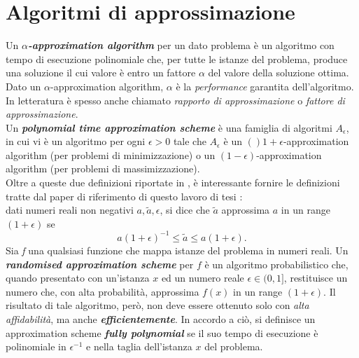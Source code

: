 \section{Algoritmi di approssimazione}\label{sec:approxalgo}
Un \textit{\textbf{$\alpha$-approximation algorithm}} per un dato problema è un algoritmo con tempo di esecuzione polinomiale che, per tutte le istanze del problema, produce una soluzione il cui valore è entro un fattore $\alpha$ del valore della soluzione ottima.\\
Dato un $\alpha$-approximation algorithm, $\alpha$ è la \textit{performance} garantita dell'algoritmo. In letteratura è spesso anche chiamato \textit{rapporto di approssimazione} o \textit{fattore di approssimazione}.\\
Un \textit{\textbf{polynomial time approximation scheme}} è una famiglia di algoritmi ${A_\epsilon}$, in cui vi è un algoritmo per ogni $\epsilon > 0$ tale che $A_\epsilon$ è un $()1+\epsilon$-approximation algorithm (per problemi di minimizzazione) o un $(1-\epsilon)$-approximation algorithm (per problemi di massimizzazione).\\
Oltre a queste due definizioni riportate in \cite{williamson2011design}, è interessante fornire le definizioni tratte dal paper di riferimento di questo lavoro di tesi \cite{jerrum1993polynomial}:\\
dati numeri reali non negativi $a, \tilde{a}, \epsilon$, si dice che $\tilde{a}$ approssima $a$ in un range $(1+\epsilon)$ se
\begin{equation}
	a(1+\epsilon)^{-1} \leq \tilde{a} \leq a(1+\epsilon).
\end{equation}
Sia \textit{f} una qualsiasi funzione che mappa istanze del problema in numeri reali. Un \textit{\textbf{randomised approximation scheme}} per $f$ è un algoritmo probabilistico che, quando presentato con un'istanza $x$ ed un numero reale $\epsilon \in (0,1]$, restituisce un numero che, con alta probabilità, approssima $f(x)$ in un range $(1+\epsilon)$. Il risultato di tale algoritmo, però, non deve essere ottenuto solo con \textit{alta affidabilità}, ma anche \textit{\textbf{efficientemente}}. In accordo a ciò, si definisce un approximation scheme \textit{\textbf{fully polynomial}} se il suo tempo di esecuzione è polinomiale in $\epsilon^{-1}$ e nella taglia dell'istanza $x$ del problema.